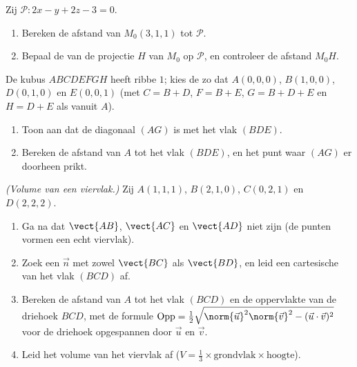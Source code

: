\begin{exercise}[$\star\star$]\label{exo:g12:space:7}
Zij $\mathcal P : 2x - y + 2z - 3 = 0$.
\begin{enumerate}
  \item Bereken de afstand van $M_0(3, 1, 1)$ tot $\mathcal P$.
  \item Bepaal de  van de  projectie $H$ van $M_0$ op
        $\mathcal P$, en controleer de afstand $M_0H$.
\end{enumerate}
\end{exercise}

\begin{exercise}[$\star\star\star$]\label{exo:g12:space:8}
De kubus $ABCDEFGH$ heeft ribbe $1$; kies de  zo dat
$A(0,0,0)$, $B(1,0,0)$, $D(0,1,0)$ en $E(0,0,1)$ (met
$C = B + D$, $F = B + E$, $G = B + D + E$ en $H = D + E$ als  vanuit
$A$).
\begin{enumerate}
  \item Toon aan dat de diagonaal $(AG)$  is met het vlak $(BDE)$.
  \item Bereken de afstand van $A$ tot het vlak $(BDE)$, en het punt waar
        $(AG)$ er doorheen prikt.
\end{enumerate}
\end{exercise}

\begin{exercise}[$\star\star\star$]\label{exo:g12:space:9}
\emph{(Volume van een viervlak.)} Zij $A(1,1,1)$, $B(2,1,0)$, $C(0,2,1)$ en
$D(2,2,2)$.
\begin{enumerate}
  \item Ga na dat $\vect{AB}$, $\vect{AC}$ en $\vect{AD}$ niet  zijn
        (de punten vormen een echt viervlak).
  \item Zoek een  $\vec n$  met zowel $\vect{BC}$ als
        $\vect{BD}$, en leid een cartesische  van het vlak $(BCD)$
        af.
  \item Bereken de afstand van $A$ tot het vlak $(BCD)$ en de oppervlakte van
        de driehoek $BCD$, met de formule
        $\text{Opp} = \frac12\sqrt{\norm{\vec u}^2\norm{\vec v}^2 -
        (\vec u \cdot \vec v)^2}$ voor de driehoek opgespannen door
        $\vec u$ en $\vec v$.
  \item Leid het volume van het viervlak af
        ($V = \frac13 \times \text{grondvlak} \times \text{hoogte}$).
\end{enumerate}
\end{exercise}

